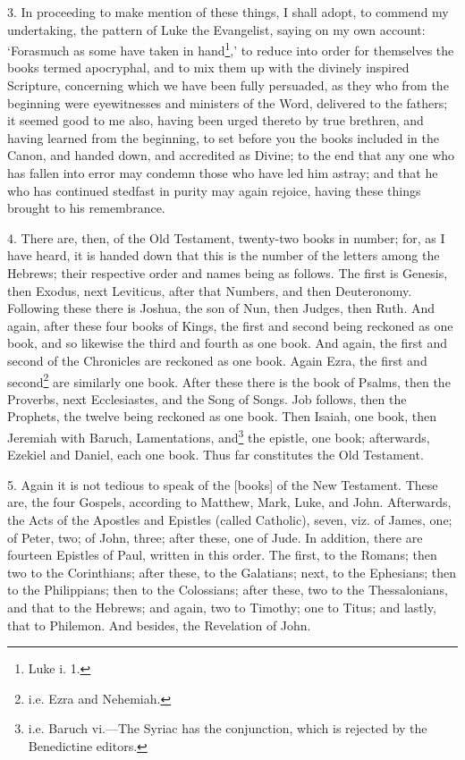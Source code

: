 3. In proceeding to make mention of these things, I shall adopt, to commend my undertaking, the pattern of Luke the Evangelist, saying on my own account: ‘Forasmuch as some have taken in hand\footnote{Luke i. 1.},’ to reduce into order for themselves the books termed apocryphal, and to mix them up with the divinely inspired Scripture, concerning which we have been fully persuaded, as they who from the beginning were eyewitnesses and ministers of the Word, delivered to the fathers; it seemed good to me also, having been urged thereto by true brethren, and having learned from the beginning, to set before you the books included in the Canon, and handed down, and accredited as Divine; to the end that any one who has fallen into error may condemn those who have led him astray; and that he who has continued stedfast in purity may again rejoice, having these things brought to his remembrance.

4. There are, then, of the Old Testament, twenty-two books in number; for, as I have heard, it is handed down that this is the number of the letters among the Hebrews; their respective order and names being as follows. The first is Genesis, then Exodus, next Leviticus, after that Numbers, and then Deuteronomy. Following these there is Joshua, the son of Nun, then Judges, then Ruth. And again, after these four books of Kings, the first and second being reckoned as one book, and so likewise the third and fourth as one book. And again, the first and second of the Chronicles are reckoned as one book. Again Ezra, the first and second\footnote{i.e. Ezra and Nehemiah.} are similarly one book. After these there is the book of Psalms, then the Proverbs, next Ecclesiastes, and the Song of Songs. Job follows, then the Prophets, the twelve being reckoned as one book. Then Isaiah, one book, then Jeremiah with Baruch, Lamentations, and\footnote{i.e. Baruch vi.—The Syriac has the conjunction, which is rejected by the Benedictine editors.} the epistle, one book; afterwards, Ezekiel and Daniel, each one book. Thus far constitutes the Old Testament.

5. Again it is not tedious to speak of the [books] of the New Testament. These are, the four Gospels, according to Matthew, Mark, Luke, and John. Afterwards, the Acts of the Apostles and Epistles (called Catholic), seven, viz. of James, one; of Peter, two; of John, three; after these, one of Jude. In addition, there are fourteen Epistles of Paul, written in this order. The first, to the Romans; then two to the Corinthians; after these, to the Galatians; next, to the Ephesians; then to the Philippians; then to the Colossians; after these, two to the Thessalonians, and that to the Hebrews; and again, two to Timothy; one to Titus; and lastly, that to Philemon. And besides, the Revelation of John.

